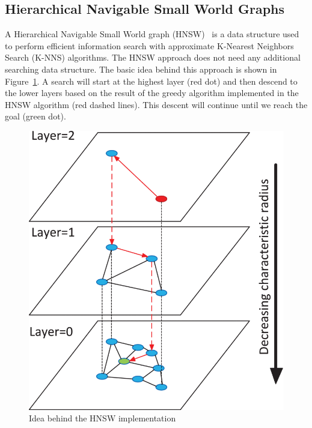 \subsection{Hierarchical Navigable Small World Graphs}\label{subsec:hierarchical-navigable-small-world-graphs}
A Hierarchical Navigable Small World graph (HNSW)~\cite{malkov_efficient_2020} is a data structure used to perform efficient information search with approximate K-Nearest Neighbors Search (K-NNS) algorithms.
The HNSW approach does not need any additional searching data structure.
The basic idea behind this approach is shown in Figure~\ref{fig:hnsw}.
A search will start at the highest layer (red dot) and then descend to the lower layers based on the result of the greedy algorithm implemented in the HNSW algorithm (red dashed lines).
This descent will continue until we reach the goal (green dot).

\begin{figure}[!h]
    \begin{center}
        \includegraphics[width=0.3\linewidth]{assets/png/background/hnsw}
    \end{center}

    \caption{Idea behind the HNSW implementation~\cite{malkov_efficient_2020}}
    \label{fig:hnsw}
\end{figure}

